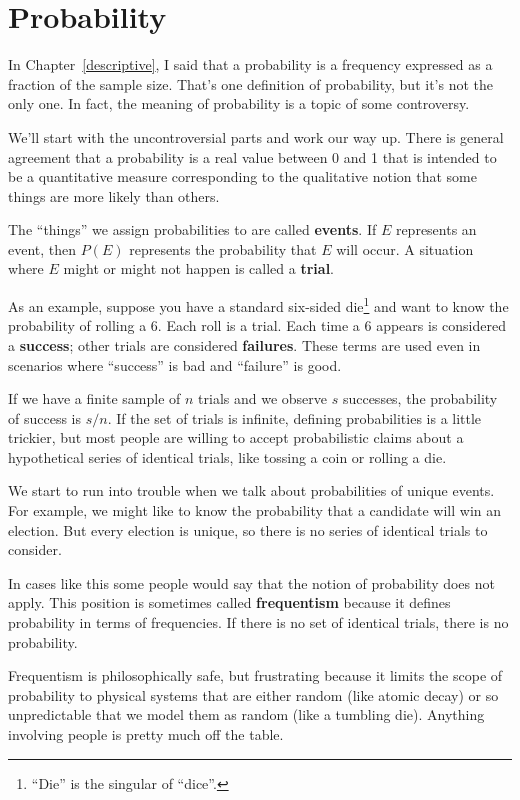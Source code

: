 \documentclass[12pt]{book}
\begin{document}
\chapter{Probability}
\label{probability}

In Chapter~\ref{descriptive}, I said that a probability is a frequency
expressed as a fraction of the sample size.  That's one definition of
probability, but it's not the only one.  In fact, the meaning
of probability is a topic of some controversy.

We'll start with the uncontroversial parts and work our way up.  There
is general agreement that a probability is a real value between 0 and
1 that is intended to be a quantitative measure corresponding to the
qualitative notion that some things are more likely than others.

The ``things'' we assign probabilities to are called {\bf events}.  If
$E$ represents an event, then $P(E)$ represents the probability that
$E$ will occur.  A situation where $E$ might or might not happen is
called a {\bf trial}.

As an example, suppose you have a standard six-sided
die\footnote{``Die'' is the singular of ``dice''.} and want to know
the probability of rolling a 6.  Each roll is a trial.
Each time a 6 appears is considered a {\bf success}; other trials are
considered {\bf failures}.  These terms are used even in scenarios
where ``success'' is bad and ``failure'' is good.

If we have a finite sample of $n$ trials and we observe $s$ successes,
the probability of success is $s/n$.  If the set of trials is
infinite, defining probabilities is a little trickier, but most people
are willing to accept probabilistic claims about a hypothetical series
of identical trials, like tossing a coin or rolling a die.

We start to run into trouble when we talk about probabilities of
unique events.  For example, we might like to know the probability
that a candidate will win an election.  But every election is unique,
so there is no series of identical trials to consider.

In cases like this some people would say that the notion of
probability does not apply.  This position is sometimes called {\bf
  frequentism} because it defines probability in terms of frequencies.
If there is no set of identical trials, there is no probability.

Frequentism is philosophically safe, but
frustrating because it limits the scope of probability to physical
systems that are either random (like atomic decay) or so unpredictable
that we model them as random (like a tumbling die).  Anything involving
people is pretty much off the table.
\end{document}
